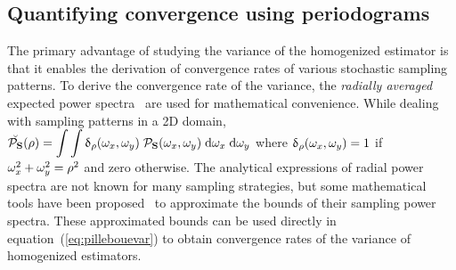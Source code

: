 \subsection{Quantifying convergence using periodograms} \label{sec:convErr}
The primary advantage of studying the variance of the homogenized estimator is that it enables the derivation of convergence rates of various stochastic sampling patterns.
To derive the convergence rate of the variance, the \emph{radially averaged} expected power spectra \Exp{\RadialPowerSpec{\sfsym}(\RadialFreq)}\ are used for mathematical convenience. While dealing with sampling patterns in a 2D domain, 
$\breve{\mathcal{P}_{\mathbf{S}}}(\rho) = 
  \displaystyle\int \displaystyle\int \updelta_\rho (\mathbf{\omega}_x, \mathbf{\omega}_y) \; \mathcal{P}_{\mathbf{S}}(\mathbf{\omega}_x, \mathbf{\omega}_y) \; \mathrm{d}\mathbf{\omega}_x \; \mathrm{d}\mathbf{\omega}_y$ where $\updelta_\rho (\mathbf{\omega}_x, \mathbf{\omega}_y) = 1$ if $\mathbf{\omega}_x^2 + \mathbf{\omega}_y^2 = \rho^2$ and zero otherwise.
The analytical expressions of radial power spectra are not known for many sampling strategies, but some mathematical tools have been proposed~\cite{Pilleboue:2015:VAM} to approximate the bounds of their sampling power spectra. These approximated bounds can be used directly in equation~(\ref{eq:pillebouevar}) to obtain convergence rates of the variance of homogenized estimators.

